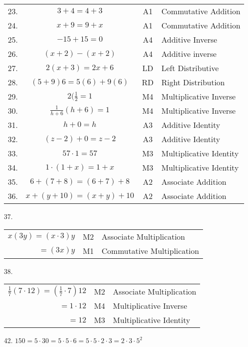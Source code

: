 \documentclass[letterpaper]{article}
\begin{document}
\begin{tabular}{cccl}
23. & $3+4=4+3$ & A1 & Commutative Addition \\
24. & $x+9=9+x$ & A1 & Commutative Addition \\
25. & $-15 + 15 = 0$ & A4 & Additive Inverse \\
26. & $(x + 2) - (x + 2)$ & A4 & Additive inverse \\
27. & $2(x+3)=2x+6$ & LD & Left Distributive \\
28. & $(5 + 9)6 = 5(6)+9(6)$ & RD & Right Distribution \\
29. & $2(\frac{1}{2}=1$ & M4 & Multiplicative Inverse\\
30. & $\frac{1}{h+6}(h+6)=1$ & M4 & Multiplicative Inverse \\
31. & $h+0=h$ & A3 & Additive Identity \\
32. & $(z-2)+0=z-2$ & A3 & Additive Identity \\
33. & $57 \cdot 1 = 57$ & M3 & Multiplicative Identity \\
34. & $1 \cdot (1+x) = 1 + x$ & M3 & Multiplicative Identity \\
35. & $6+(7+8)=(6+7)+8$ & A2 & Associate Addition \\
36. & $x+(y+10)=(x+y)+10$ & A2 & Associate Addition \\
\end{tabular}

\bigskip

37.

\bigskip

\begin{tabular}{rcl}
$x(3y)=(x \cdot 3)y$ & M2 & Associate Multiplication \\
$=(3x)y$ & M1 & Commutative Multiplication \\
\end{tabular}

\bigskip

38.

\bigskip

\begin{tabular}{rcl}
$\frac{1}{7}(7\cdot12)=(\frac{1}{7}\cdot7)12$ & M2 &
    Associate Multiplication \\
$=1\cdot12$ & M4 & Multiplicative Inverse \\
$=12$ & M3 & Multiplicative Identity \\
\end{tabular}

\bigskip

42. $150 = 5\cdot30 = 5\cdot5\cdot6 = 5\cdot5\cdot2\cdot3 = 2\cdot3\cdot5^2$
\end{document}
